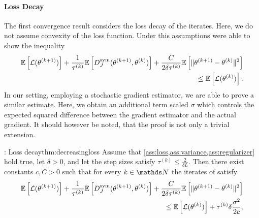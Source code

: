 \paragraph{Loss Decay}
The first convergence result considers the loss decay of the iterates. Here, we do not assume convexity of the loss function. Under this assumptions \cite{benning2018choose, benning2018modern} were able to show the inequality
%
\begin{align*}
\begin{split}
\mathbb{E}\left[\mathcal{L}(\theta^{(k+1)})\right] + \frac{1}{\tau^{(k)}}\mathbb{E}\left[ D^\mathrm{sym}_J(\theta^{(k+1)},\theta^{(k)})\right] + \frac{C}{2\delta\tau^{(k)}}\mathbb{E}\left[\|\theta^{(k+1)}-\theta^{(k)}\|^2\right] \\
\leq \mathbb{E}\left[\mathcal{L}(\theta^{(k)})\right].
\end{split}
\end{align*}
%
%
In our setting, employing a stochastic gradient estimator, we are able to prove a similar estimate. Here, we obtain an additional term scaled $\sigma$ which controls the expected squared difference between the gradient estimator and the actual gradient. It should however be noted, that the proof is not only a trivial extension.
%
%
\begin{theorem}{\cite[Th. 2]{bungert2022bregman}: Loss decay}{thm:decreasingloss}
Assume that \cref{ass:loss,ass:variance,ass:regularizer} hold true, let $\delta>0$, and let the step sizes satisfy $\tau^{(k)} \leq \frac{2}{\delta L}$.
Then there exist constants $c,C>0$ such that for every $k\in\N$ the iterates of  satisfy 
\begin{align}\label{ineq:loss_decay}
    \begin{split}
    \mathbb{E}\left[\mathcal{L}(\theta^{(k+1)})\right] + \frac{1}{\tau^{(k)}}\mathbb{E}\left[ D^\mathrm{sym}_J(\theta^{(k+1)},\theta^{(k)})\right] + \frac{C}{2\delta\tau^{(k)}}\mathbb{E}\left[\|\theta^{(k+1)}-\theta^{(k)}\|^2\right] \\
    \leq \mathbb{E}\left[\mathcal{L}(\theta^{(k)})\right] + \tau^{(k)}\delta\frac{\sigma^2}{2c},
    \end{split}
\end{align}
\end{theorem}

